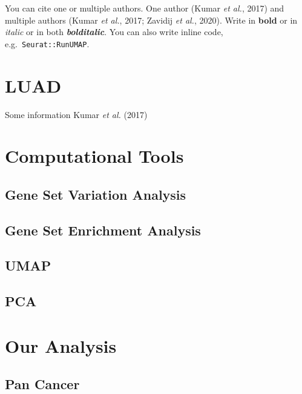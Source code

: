 \documentclass[
  parskip,
  oneside]{scrreprt}
\begin{document}
You can cite one or multiple authors. One author (Kumar \emph{et al.},
2017) and multiple authors (Kumar \emph{et al.}, 2017; Zavidij \emph{et
al.}, 2020). Write in \textbf{bold} or in \emph{italic} or in both
\textbf{\emph{bolditalic}}. You can also write inline code,
e.g.~\texttt{Seurat::RunUMAP}.

\hypertarget{luad}{%
\section{LUAD}\label{luad}}

Some information Kumar \emph{et al.} (2017)

\hypertarget{computational-tools}{%
\section{Computational Tools}\label{computational-tools}}

\hypertarget{gene-set-variation-analysis}{%
\subsection{Gene Set Variation
Analysis}\label{gene-set-variation-analysis}}

\hypertarget{gene-set-enrichment-analysis}{%
\subsection{Gene Set Enrichment
Analysis}\label{gene-set-enrichment-analysis}}

\hypertarget{umap}{%
\subsection{UMAP}\label{umap}}

\hypertarget{pca}{%
\subsection{PCA}\label{pca}}

\hypertarget{our-analysis}{%
\section{Our Analysis}\label{our-analysis}}

\hypertarget{pan-cancer}{%
\subsection{Pan Cancer}\label{pan-cancer}}
\end{document}
